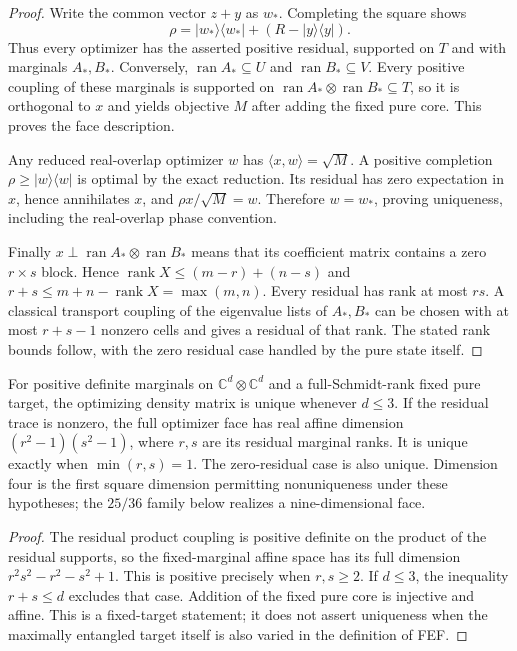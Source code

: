 \begin{proof}
Write the common vector $z+y$ as $w_*$. Completing the square shows
\[
 \rho=|w_*\rangle\langle w_*|+(R-|y\rangle\langle y|).
\]
Thus every optimizer has the asserted positive residual, supported on
$T$ and with marginals $A_*,B_*$. Conversely, $\operatorname{ran}A_*
\subseteq U$ and $\operatorname{ran}B_*\subseteq V$. Every positive
coupling of these marginals is supported on
$\operatorname{ran}A_*\otimes\operatorname{ran}B_*\subseteq T$, so it is
orthogonal to $x$ and yields objective $M$ after adding the fixed pure
core. This proves the face description.

Any reduced real-overlap optimizer $w$ has
$\langle x,w\rangle=\sqrt M$. A positive completion
$\rho\ge|w\rangle\langle w|$ is optimal by the exact reduction. Its
residual has zero expectation in $x$, hence annihilates $x$, and
$\rho x/\sqrt M=w$. Therefore $w=w_*$, proving uniqueness, including
the real-overlap phase convention.

Finally $x\perp\operatorname{ran}A_*\otimes\operatorname{ran}B_*$
means that its coefficient matrix contains a zero $r\times s$ block.
Hence $\operatorname{rank}X\le(m-r)+(n-s)$ and
$r+s\le m+n-\operatorname{rank}X=\max(m,n)$. Every residual has rank
at most $rs$. A classical transport coupling of the eigenvalue lists of
$A_*,B_*$ can be chosen with at most $r+s-1$ nonzero cells and gives a
residual of that rank. The stated rank bounds follow, with the zero
residual case handled by the pure state itself.
\end{proof}

\begin{corollary}
For positive definite marginals on $\mathbb C^d\otimes\mathbb C^d$ and a full-Schmidt-rank fixed pure target, the optimizing density matrix is unique whenever $d\le3$.
If the residual trace is nonzero, the full optimizer face has real affine dimension
$(r^2-1)(s^2-1)$, where $r,s$ are its residual marginal ranks. It is unique exactly when $\min(r,s)=1$. The zero-residual case is also unique.
Dimension four is the first square dimension permitting nonuniqueness under these hypotheses; the $25/36$ family below realizes a nine-dimensional face.
\end{corollary}
\begin{proof}
The residual product coupling is positive definite on the product of the residual supports, so the fixed-marginal affine space has its full dimension $r^2s^2-r^2-s^2+1$. This is positive precisely when $r,s\ge2$. If $d\le3$, the inequality $r+s\le d$ excludes that case. Addition of the fixed pure core is injective and affine. This is a fixed-target statement; it does not assert uniqueness when the maximally entangled target itself is also varied in the definition of FEF.
\end{proof}

